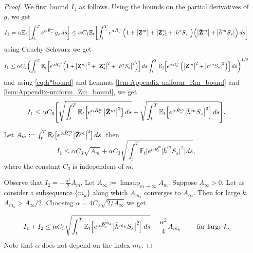 \documentclass{article}
\newcommand{\E}{\mathbb{E}}
\def\bRm{\bar{R}^m}
\def\Zm{\bar{\bf Z}^m}
\def\hm{\bar{h}^m}
\def\bZ{{\bf Z}}
\def\hm{\bar{h}^m}
\begin{document}
\begin{proof}
 
We first bound $I_1$ as follows.  Using the bounds on the partial derivatives of $g$, we get
\[
	I_1  = \alpha \E_t\biggl[\int_t^Te^{\alpha \bRm_s} \bar{g}_s \, ds \biggr] \leq  \alpha C_1 \E_t\biggl[\int_t^Te^{\alpha \bRm_s}\Bigl(1+\bigl\vert \bZ^m \bigr\vert+\bigl\vert \bZ^*_s \vert+\vert h^*S_s \bigr\vert \Bigr) \Bigl(\bigl\vert \Zm \bigr\vert +\bigl\vert \hm  S_s \bigr\vert \Bigr) \, ds \biggr] 
\]
using Cauchy-Schwarz we get
\[
	I_1  \leq  \alpha C_2 \biggl(\int_t^T \E_t\Bigl[e^{\alpha \bRm_s}\Bigl(1+\bigl\vert \bZ^m\bigr\vert^2+\bigl\vert \bZ^*_s\bigr\vert^2+\bigl\vert h^*S_s\bigr\vert^2\Bigr)\Bigr] \, ds \int_t^T \E_t\Bigl[e^{\alpha \bRm_s}\Bigl(\bigl\vert \Zm\bigr\vert ^2+\bigl\vert \hm S_s\bigr\vert ^2\Bigr)\Bigr] \, ds\biggr)^{1/2}
	\]
and using \eqref{eq:h*bound} and  Lemmas \ref{lem:Appendix-uniform_Rm_bound} and  \ref{lem:Appendix-uniform_Zm_bound}, we get
\[
	I_1   \leq  \alpha C_3 \Biggl[\sqrt{\int_t^T \E_t \Bigl[ e^{\alpha \bRm_s} \bigl\vert \Zm \bigr\vert^2\bigr] \, ds}+\sqrt{\int_t^T \E_t \Bigl[e^{\alpha \bRm_s} \bigl\vert \hm S_s\bigr\vert ^2\Bigr] \, ds}\Biggr].
\]

Let $A_m:=\int_t^T \E_t \bigl[e^{\alpha \bRm_s}\bigl\vert \Zm \bigr\vert^2 \bigr] \, ds$, then
\[
	I_1\leq \alpha C_3 \sqrt{A_m} +\alpha C_3 \sqrt{\int_t^T\E_t \bigl[e^{\alpha \bRm_s}\bigl\vert \hm S_s\bigr\vert ^2\bigr] \, ds},
\]
where the constant $C_3$ is independent of $m$.

Observe that $I_2= -\frac{\alpha^2}{2}A_m$. Let $A_\infty:=\limsup_{m\to\infty} A_m$. Suppose $A_\infty>0$. Let us consider a subsequence $\{m_k\}$ along which $A_{m_k}$ converges to $A_\infty$. Then for large $k$,  $A_{m_k}> A_\infty/2$. Choosing $\alpha = 4C_3 \sqrt{2/A_\infty}$ we get
 
\begin{equation}\label{eq:Bound_I1+I2}
	I_1+I_2\leq \alpha C_3 \sqrt{\int_t^T \E_t \Bigl[e^{\alpha \bar{R}^{m_k}_s} \bigl \vert \bar{h}^{m_k} S_s\bigr\vert^2\Bigr] \, ds} - \frac{\alpha^2}{4} A_{m_k}\qquad \text{ for large }k.
\end{equation}
Note that $\alpha$ does not depend on the index $m_k$.  


\end{proof}
\end{document}
